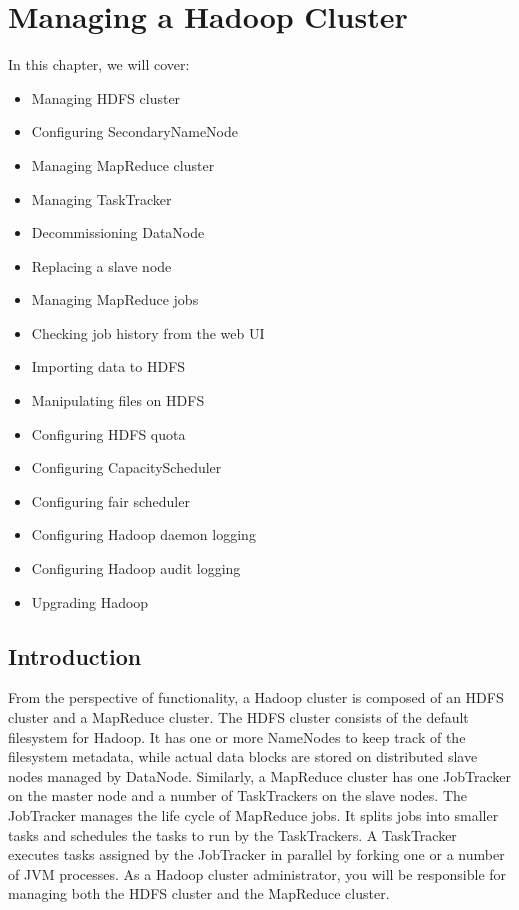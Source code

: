 \chapter{Managing a Hadoop Cluster}
In this chapter, we will cover: \\
\begin{itemize}
  \item Managing HDFS cluster
  \item Configuring SecondaryNameNode
  \item Managing MapReduce cluster
  \item Managing TaskTracker
  \item Decommissioning DataNode
  \item Replacing a slave node
  \item Managing MapReduce jobs
  \item Checking job history from the web UI
  \item Importing data to HDFS
  \item Manipulating files on HDFS
  \item Configuring HDFS quota
  \item Configuring CapacityScheduler
  \item Configuring fair scheduler
  \item Configuring Hadoop daemon logging
  \item Configuring Hadoop audit logging
  \item Upgrading Hadoop
\end{itemize}

\section{Introduction}
From the perspective of functionality, a Hadoop cluster is composed of an HDFS cluster and a MapReduce cluster. The HDFS cluster consists of the default filesystem for Hadoop. It has one or more NameNodes to keep track of the filesystem metadata, while actual data blocks are stored on distributed slave nodes managed by DataNode. Similarly, a MapReduce cluster has one JobTracker on the master node and a number of TaskTrackers on the slave nodes. The JobTracker manages the life cycle of MapReduce jobs. It splits jobs into smaller tasks and schedules the tasks to run by the TaskTrackers. A TaskTracker executes tasks assigned by the JobTracker in parallel by forking one or a number of JVM processes. As a Hadoop cluster administrator, you will be responsible for managing both the HDFS cluster and the MapReduce cluster.

